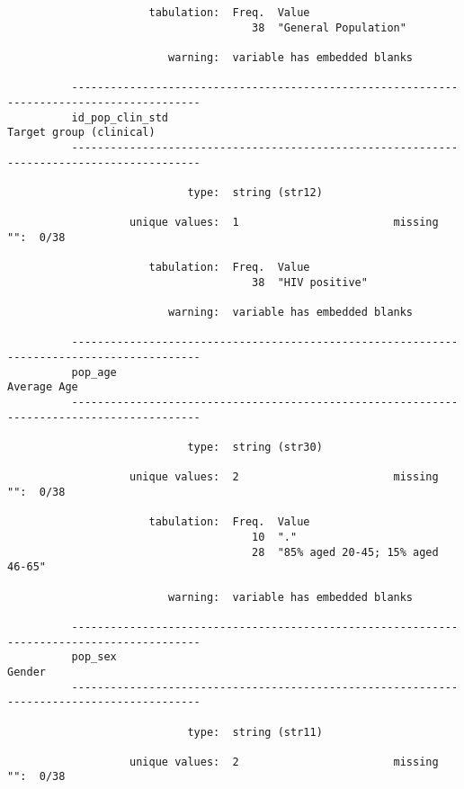\documentclass{article}
\begin{document}
\begin{verbatim}
                      tabulation:  Freq.  Value
                                      38  "General Population"
          
                         warning:  variable has embedded blanks
          
          ------------------------------------------------------------------------------------------
          id_pop_clin_std                                                    Target group (clinical)
          ------------------------------------------------------------------------------------------
          
                            type:  string (str12)
          
                   unique values:  1                        missing "":  0/38
          
                      tabulation:  Freq.  Value
                                      38  "HIV positive"
          
                         warning:  variable has embedded blanks
          
          ------------------------------------------------------------------------------------------
          pop_age                                                                        Average Age
          ------------------------------------------------------------------------------------------
          
                            type:  string (str30)
          
                   unique values:  2                        missing "":  0/38
          
                      tabulation:  Freq.  Value
                                      10  "."
                                      28  "85% aged 20-45; 15% aged 46-65"
          
                         warning:  variable has embedded blanks
          
          ------------------------------------------------------------------------------------------
          pop_sex                                                                             Gender
          ------------------------------------------------------------------------------------------
          
                            type:  string (str11)
          
                   unique values:  2                        missing "":  0/38
          

\end{verbatim}
\end{document}
